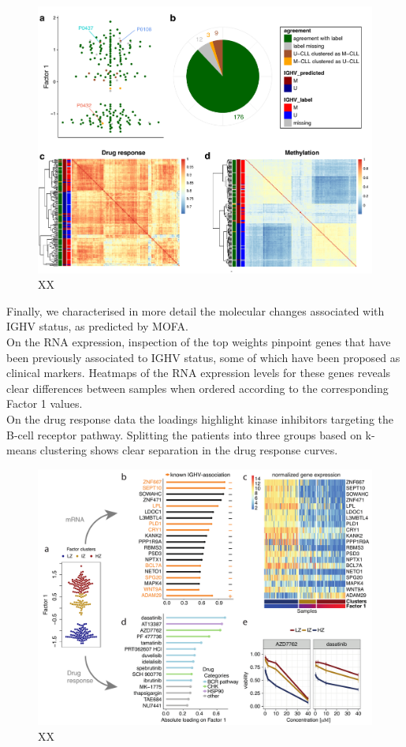 \begin{figure}[H]
	\centering 	
	\includegraphics[width=1.0\textwidth]{MOFA_IGHV_outlier}
	\caption{XX}
	\label{fig:MOFA_IGHV_outlier}
\end{figure}


Finally, we characterised in more detail the molecular changes associated with IGHV status, as predicted by MOFA.\\
On the RNA expression, inspection of the top weights pinpoint genes that have been previously associated to IGHV status, some of which have been proposed as clinical markers\cite{Vasconcelos2005,Maloum2009,Trojani2011,Morabito2015,Plesingerova2017}. Heatmaps of the RNA expression levels for these genes reveals clear differences between samples when ordered according to the corresponding Factor 1 values.\\
On the drug response data the loadings highlight kinase inhibitors targeting the B-cell receptor pathway. Splitting the patients into three groups based on k-means clustering shows clear separation in the drug response curves.

\begin{figure}[H]
	\centering 	
	\includegraphics[width=1.0\textwidth]{MOFA_CLL_Factor1}
	\caption{XX}
	\label{fig:MOFA_CLL_Factor1}
\end{figure}

